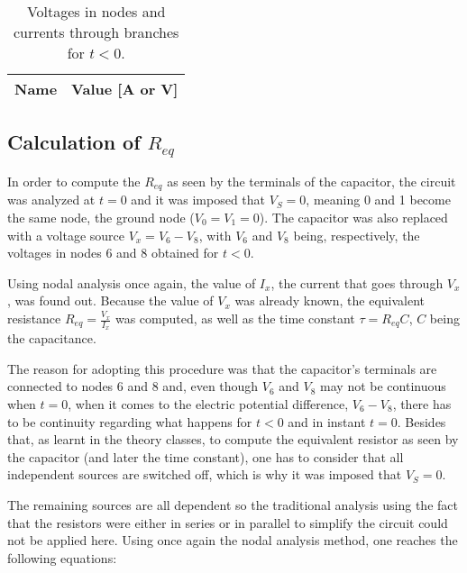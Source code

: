 
\begin{table}[H]
  \centering
  \begin{tabular}{|c|c|}
    \hline    
    {\bf Name} & {\bf Value [A or V]} \\ \hline
    
  \end{tabular}
  \caption{Voltages in nodes and currents through branches for $t<0$.}
  \label{tab:t<0}
\end{table}



\subsection{Calculation of $R_{eq}$} %
In order to compute the $R_{eq}$ as seen by the terminals of the capacitor, the circuit was analyzed at $t = 0$ and it was imposed that $V_S=0$, meaning 0 and 1 become the same node, the ground node ($V_0=V_1=0$). The capacitor was also replaced with a voltage source $V_x=V_6-V_8$, with $V_6$ and $V_8$ being, respectively, the voltages in nodes 6 and 8 obtained for $t<0$.
\par
Using nodal analysis once again, the value of $I_x$, the current that goes through $V_x$, was found out. Because the value of $V_x$ was already known, the equivalent resistance $R_{eq} = \frac{V_x}{I_x}$ was computed, as well as the time constant $\tau = R_{eq}C$, $C$ being the capacitance.
\par
The reason for adopting this procedure was that the capacitor's terminals are connected to nodes 6 and 8 and, even though $V_6$ and $V_8$ may not be continuous when $t=0$, when it comes to the electric potential difference, $V_6-V_8$, there has to be continuity regarding what happens for $t<0$ and in instant $t=0$. Besides that, as learnt in the theory classes, to compute the equivalent resistor as seen by the capacitor (and later the time constant), one has to consider that all independent sources are switched off, which is why it was imposed that $V_S=0$.

The remaining sources are all dependent so the traditional analysis using the fact that the resistors were either in series or in parallel to simplify the circuit could not be applied here.
Using once again the nodal analysis method, one reaches the following equations:

